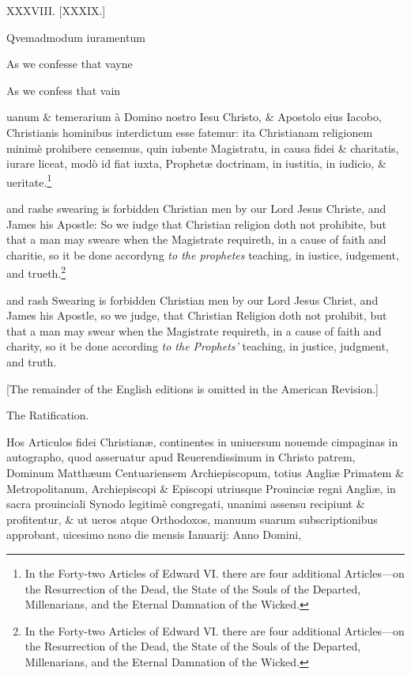 XXXVIII. [XXXIX.]


Qvemadmodum iuramentum

As we confesse that vayne

As we confess that vain

uanum \& temerarium à Domino nostro Iesu Christo, \& Apostolo eius Iacobo, Christianis hominibus interdictum esse fatemur: ita Christianam religionem minimè prohibere censemus, quin iubente Magistratu, in causa fidei \& charitatis, iurare liceat, modò id fiat iuxta, Prophetæ doctrinam, in iustitia, in iudicio, \& ueritate.\footnote{In the Forty-two Articles of Edward VI. there are four additional Articles—on the Resurrection of the Dead, the State of the Souls of the Departed, Millenarians, and the Eternal Damnation of the Wicked.}

and rashe swearing is forbidden Christian men by our Lord Jesus Christe, and James his Apostle: So we iudge that Christian religion doth not prohibite, but that a man may sweare when the Magistrate requireth, in a cause of faith and charitie, so it be done accordyng \emph{to the prophetes} teaching, in iustice, iudgement, and trueth.\footnote{In the Forty-two Articles of Edward VI. there are four additional Articles—on the Resurrection of the Dead, the State of the Souls of the Departed, Millenarians, and the Eternal Damnation of the Wicked.}

and rash Swearing is forbidden Christian men by our Lord Jesus Christ, and James his Apostle, so we judge, that Christian Religion doth not prohibit, but that a man may swear when the Magistrate requireth, in a cause of faith and charity, so it be done according \emph{to the Prophets'} teaching, in justice, judgment, and truth.

[The remainder of the English editions is omitted in the American Revision.]

The Ratification.

Hos Articulos fidei Christianæ, continentes in uniuersum nouemde cimpaginas in autographo, quod asseruatur apud Reuerendissimum in Christo patrem, Dominum Matthæum Centuariensem Archiepiscopum, totius Angliæ Primatem \& Metropolitanum, Archiepiscopi \& Episcopi utriusque Prouinciæ regni Angliæ, in sacra prouinciali Synodo legitimè congregati, unanimi assensu recipiunt \& profitentur, \& ut ueros atque Orthodoxos, manuum suarum subscriptionibus approbant, uicesimo nono die mensis Ianuarij: Anno Domini,

